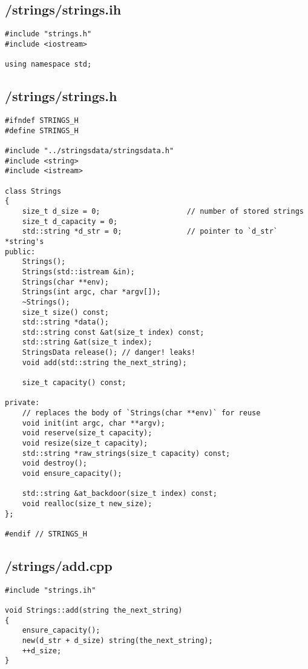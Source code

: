 \documentclass{article}
\begin{document}
\subsection*{/strings/strings.ih}
\begin{verbatim}
#include "strings.h"
#include <iostream>

using namespace std;

\end{verbatim}
\subsection*{/strings/strings.h}
\begin{verbatim}
#ifndef STRINGS_H
#define STRINGS_H

#include "../stringsdata/stringsdata.h"
#include <string>
#include <istream>

class Strings 
{
    size_t d_size = 0;                    // number of stored strings
    size_t d_capacity = 0;
    std::string *d_str = 0;               // pointer to `d_str` *string's
public:
    Strings();
    Strings(std::istream &in);
    Strings(char **env);
    Strings(int argc, char *argv[]);
    ~Strings();
    size_t size() const;
    std::string *data();
    std::string const &at(size_t index) const;
    std::string &at(size_t index);
    StringsData release(); // danger! leaks!
    void add(std::string the_next_string);

    size_t capacity() const;

private:
    // replaces the body of `Strings(char **env)` for reuse
    void init(int argc, char **argv);
    void reserve(size_t capacity);
    void resize(size_t capacity);
    std::string *raw_strings(size_t capacity) const;
    void destroy();
    void ensure_capacity();

    std::string &at_backdoor(size_t index) const;
    void realloc(size_t new_size);
};

#endif // STRINGS_H

\end{verbatim}
\subsection*{/strings/add.cpp}
\begin{verbatim}
#include "strings.ih"

void Strings::add(string the_next_string)
{
    ensure_capacity();
    new(d_str + d_size) string(the_next_string);
    ++d_size;
}

\end{verbatim}
\end{document}
